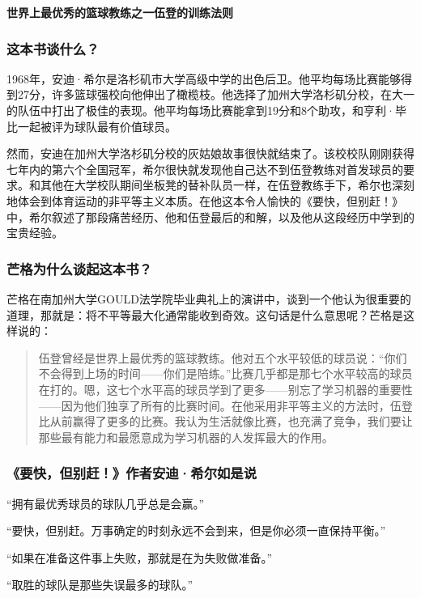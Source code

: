 \cleardoublepage
{}


\begin{BookSummaryBox}
\textbf{世界上最优秀的篮球教练之一伍登的训练法则}
\par
\end{BookSummaryBox}

\subsubsection*{这本书谈什么？}

1968年，安迪·希尔是洛杉矶市大学高级中学的出色后卫。他平均每场比赛能够得到27分，许多篮球强校向他伸出了橄榄枝。他选择了加州大学洛杉矶分校，在大一的队伍中打出了极佳的表现。他平均每场比赛能拿到19分和8个助攻，和亨利·毕比一起被评为球队最有价值球员。
\par

然而，安迪在加州大学洛杉矶分校的灰姑娘故事很快就结束了。该校校队刚刚获得七年内的第六个全国冠军，希尔很快就发现他自己达不到伍登教练对首发球员的要求。和其他在大学校队期间坐板凳的替补队员一样，在伍登教练手下，希尔也深刻地体会到体育运动的非平等主义本质。在他这本令人愉快的《要快，但别赶！》中，希尔叙述了那段痛苦经历、他和伍登最后的和解，以及他从这段经历中学到的宝贵经验。
\par

\subsubsection*{芒格为什么谈起这本书？}

芒格在南加州大学GOULD法学院毕业典礼上的演讲中，谈到一个他认为很重要的道理，那就是：将不平等最大化通常能收到奇效。这句话是什么意思呢？芒格是这样说的：
\par

\begin{quotation}
伍登曾经是世界上最优秀的篮球教练。他对五个水平较低的球员说：“你们不会得到上场的时间——你们是陪练。”比赛几乎都是那七个水平较高的球员在打的。嗯，这七个水平高的球员学到了更多——别忘了学习机器的重要性——因为他们独享了所有的比赛时间。在他采用非平等主义的方法时，伍登比从前赢得了更多的比赛。我认为生活就像比赛，也充满了竞争，我们要让那些最有能力和最愿意成为学习机器的人发挥最大的作用。
\par
\end{quotation}

\subsubsection*{《要快，但别赶！》作者安迪·希尔如是说}

“拥有最优秀球员的球队几乎总是会赢。”
\par

“要快，但别赶。万事确定的时刻永远不会到来，但是你必须一直保持平衡。”
\par

“如果在准备这件事上失败，那就是在为失败做准备。”
\par

“取胜的球队是那些失误最多的球队。”
\par

